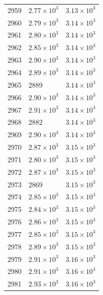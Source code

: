 \begin{table}[H]
\begin{tabular}{lll}
2959 & $\displaystyle 2.77 \times 10^{3}$ & $\displaystyle 3.13 \times 10^{3}$ \\
2960 & $\displaystyle 2.79 \times 10^{3}$ & $\displaystyle 3.14 \times 10^{3}$ \\
2961 & $\displaystyle 2.80 \times 10^{3}$ & $\displaystyle 3.14 \times 10^{3}$ \\
2962 & $\displaystyle 2.85 \times 10^{3}$ & $\displaystyle 3.14 \times 10^{3}$ \\
2963 & $\displaystyle 2.90 \times 10^{3}$ & $\displaystyle 3.14 \times 10^{3}$ \\
2964 & $\displaystyle 2.89 \times 10^{3}$ & $\displaystyle 3.14 \times 10^{3}$ \\
2965 & 2889 & $\displaystyle 3.14 \times 10^{3}$ \\
2966 & $\displaystyle 2.90 \times 10^{3}$ & $\displaystyle 3.14 \times 10^{3}$ \\
2967 & $\displaystyle 2.91 \times 10^{3}$ & $\displaystyle 3.14 \times 10^{3}$ \\
2968 & 2882 & $\displaystyle 3.14 \times 10^{3}$ \\
2969 & $\displaystyle 2.90 \times 10^{3}$ & $\displaystyle 3.14 \times 10^{3}$ \\
2970 & $\displaystyle 2.87 \times 10^{3}$ & $\displaystyle 3.15 \times 10^{3}$ \\
2971 & $\displaystyle 2.80 \times 10^{3}$ & $\displaystyle 3.15 \times 10^{3}$ \\
2972 & $\displaystyle 2.87 \times 10^{3}$ & $\displaystyle 3.15 \times 10^{3}$ \\
2973 & 2869 & $\displaystyle 3.15 \times 10^{3}$ \\
2974 & $\displaystyle 2.85 \times 10^{3}$ & $\displaystyle 3.15 \times 10^{3}$ \\
2975 & $\displaystyle 2.84 \times 10^{3}$ & $\displaystyle 3.15 \times 10^{3}$ \\
2976 & $\displaystyle 2.86 \times 10^{3}$ & $\displaystyle 3.15 \times 10^{3}$ \\
2977 & $\displaystyle 2.85 \times 10^{3}$ & $\displaystyle 3.15 \times 10^{3}$ \\
2978 & $\displaystyle 2.89 \times 10^{3}$ & $\displaystyle 3.15 \times 10^{3}$ \\
2979 & $\displaystyle 2.91 \times 10^{3}$ & $\displaystyle 3.16 \times 10^{3}$ \\
2980 & $\displaystyle 2.91 \times 10^{3}$ & $\displaystyle 3.16 \times 10^{3}$ \\
2981 & $\displaystyle 2.93 \times 10^{3}$ & $\displaystyle 3.16 \times 10^{3}$ \\

\end{tabular}
\end{table}
